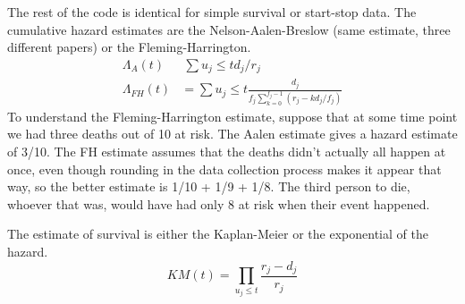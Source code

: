 \documentclass{article}
\begin{document}
The rest of the code is identical for simple survival or start-stop data.
The cumulative hazard estimates are the Nelson-Aalen-Breslow (same estimate,
three different papers) or the Fleming-Harrington.
\begin{align*}
  \Lambda_A(t) &\ \sum{u_j \le t} d_j/r_j \\
  \Lambda_{FH}(t) &= \sum{u_j \le t} \frac{d_j}
         {f_j \sum_{k=0}^{f_j-1} (r_j - kd_j/f_j)}
\end{align*}
To understand the Fleming-Harrington estimate, suppose that at some time
point we had three deaths out of 10 at risk.  The Aalen estimate gives a
hazard estimate of 3/10.  
The FH estimate assumes that the deaths didn't actually all happen at once,
even though rounding in the data collection process makes it appear that
way, so the better estimate is 1/10 + 1/9 + 1/8.  The third person to die,
whoever that was, would have had only 8 at risk when their event happened.

The estimate of survival is either the Kaplan-Meier or the exponential
of the hazard.
\begin{equation*}
  KM(t) = \prod_{u_j \le t} \frac{r_j - d_j}{r_j}
\end{equation*}
\end{document}
